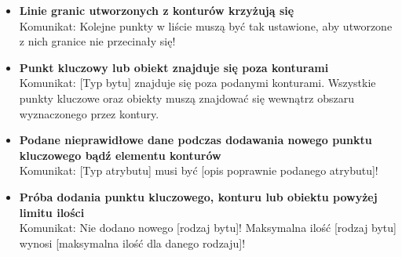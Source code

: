 \documentclass[a4paper, 10pt, titlepage]{article}
\begin{document}
\begin{itemize}

\item \textbf{Linie granic utworzonych z konturów krzyżują się}
\\Komunikat: Kolejne punkty w liście muszą być tak ustawione, aby utworzone z nich granice nie przecinały się!

\item \textbf{Punkt kluczowy lub obiekt znajduje się poza konturami}
\\Komunikat: [Typ bytu] znajduje się poza podanymi konturami. Wszystkie punkty kluczowe oraz obiekty muszą znajdować się wewnątrz obszaru wyznaczonego przez kontury.

\item \textbf{Podane nieprawidłowe dane podczas dodawania nowego punktu kluczowego bądź elementu konturów}
\\Komunikat: [Typ atrybutu] musi być [opis poprawnie podanego atrybutu]!

\item \textbf{Próba dodania punktu kluczowego, konturu lub obiektu powyżej limitu ilości}
\\Komunikat: Nie dodano nowego [rodzaj bytu]! Maksymalna ilość [rodzaj bytu] wynosi [maksymalna ilość dla danego rodzaju]!

\end{itemize}
\end{document}
